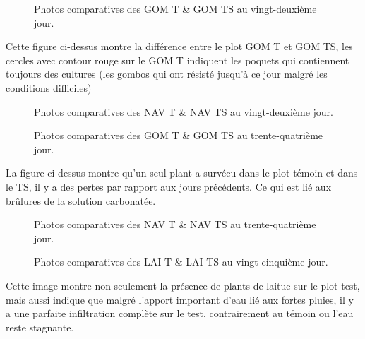 \begin{figure}[H]
    \centering
    \caption{Photos comparatives des GOM T \& GOM TS au vingt-deuxième jour. }
    \label{fig:gombo-j22}
\end{figure}
Cette figure ci-dessus montre la différence entre le plot GOM T et GOM TS, les cercles avec contour rouge sur le GOM T indiquent les poquets qui contiennent toujours des cultures (les gombos qui ont résisté jusqu'à ce jour malgré les conditions difficiles)

\begin{figure}[H]
    \centering
    \caption{Photos comparatives des NAV T \& NAV TS au vingt-deuxième jour. }
    \label{fig:navet-j22}
\end{figure}

\begin{figure}[H]
    \centering
    \caption{Photos comparatives des GOM T \& GOM TS au trente-quatrième jour. }
    \label{fig:gombo-j34}
\end{figure}
La figure ci-dessus montre qu'un seul plant a survécu dans le plot témoin et dans le TS, il y a des pertes par rapport aux jours précédents. Ce qui est lié aux brûlures de la solution carbonatée.

\begin{figure}[H]
    \centering
    \caption{Photos comparatives des NAV T \& NAV TS au trente-quatrième jour. }
    \label{fig:navet-j34}
\end{figure}

\begin{figure}[H]
    \centering
    \caption{Photos comparatives des LAI T \& LAI TS au vingt-cinquième  jour. }
    \label{fig:laitue-j25}
\end{figure}
Cette image montre non seulement la présence de plants de laitue sur le plot test,  mais aussi indique que malgré l’apport important d’eau 
lié aux fortes pluies, il y a une parfaite infiltration complète sur le test, contrairement au témoin ou l’eau reste stagnante.



















